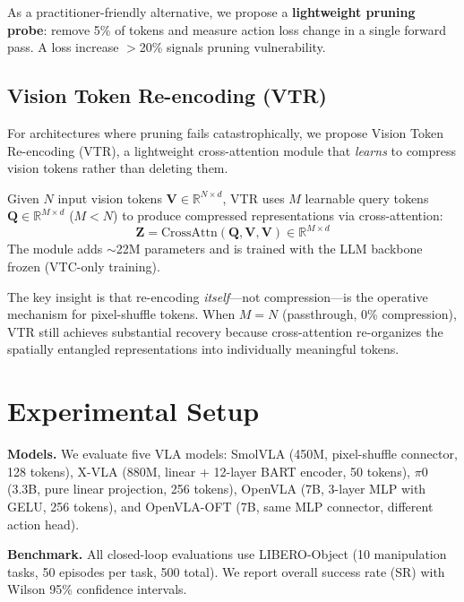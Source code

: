 \documentclass[letterpaper]{article}
\begin{document}
As a practitioner-friendly alternative, we propose a \textbf{lightweight pruning probe}: remove 5\% of tokens and measure action loss change in a single forward pass.
A loss increase $>$20\% signals pruning vulnerability.

\subsection{Vision Token Re-encoding (VTR)}
\label{sec:vtr}

For architectures where pruning fails catastrophically, we propose Vision Token Re-encoding (VTR), a lightweight cross-attention module that \emph{learns} to compress vision tokens rather than deleting them.

Given $N$ input vision tokens $\mathbf{V} \in \mathbb{R}^{N \times d}$, VTR uses $M$ learnable query tokens $\mathbf{Q} \in \mathbb{R}^{M \times d}$ ($M < N$) to produce compressed representations via cross-attention:
\begin{equation}
    \mathbf{Z} = \text{CrossAttn}(\mathbf{Q}, \mathbf{V}, \mathbf{V}) \in \mathbb{R}^{M \times d}
\end{equation}
The module adds $\sim$22M parameters and is trained with the LLM backbone frozen (VTC-only training).

The key insight is that re-encoding \emph{itself}---not compression---is the operative mechanism for pixel-shuffle tokens.
When $M=N$ (passthrough, 0\% compression), VTR still achieves substantial recovery because cross-attention re-organizes the spatially entangled representations into individually meaningful tokens.

\section{Experimental Setup}
\label{sec:setup}

\textbf{Models.}
We evaluate five VLA models: SmolVLA (450M, pixel-shuffle connector, 128 tokens), X-VLA (880M, linear + 12-layer BART encoder, 50 tokens), $\pi$0 (3.3B, pure linear projection, 256 tokens), OpenVLA (7B, 3-layer MLP with GELU, 256 tokens), and OpenVLA-OFT (7B, same MLP connector, different action head).

\textbf{Benchmark.}
All closed-loop evaluations use LIBERO-Object (10 manipulation tasks, 50 episodes per task, 500 total).
We report overall success rate (SR) with Wilson 95\% confidence intervals.
\end{document}
